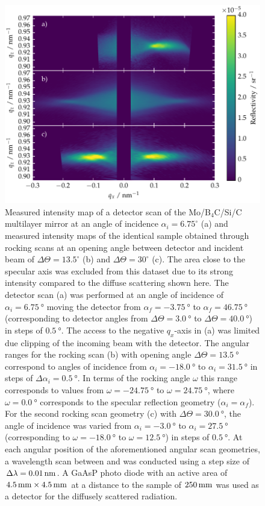 \begin{figure}[htbp]
        \includegraphics[width=\textwidth]{img/PTB17_diffuse_scattering_multiple_geometries} \caption{Measured intensity map of a detector scan of the Mo/B$_4$C/Si/C multilayer mirror at an angle of incidence $\alpha_i = 6.75^\circ$ (a) and measured intensity maps of the identical sample obtained through rocking scans at an opening angle between detector and incident beam of $\Delta \Theta = 13.5^\circ$ (b) and $\Delta \Theta = 30^\circ$ (c). The area close to the specular axis was excluded from this dataset due to its strong intensity compared to the diffuse scattering shown here. The detector scan (a) was performed at an angle of incidence of $\alpha_i = \SI{6.75}{\degree}$ moving the detector from $\alpha_f = \SI{-3.75}{\degree}$ to $\alpha_f = \SI{46.75}{\degree}$ (corresponding to detector angles from $\Delta \Theta = \SI{3.0}{\degree}$ to $\Delta \Theta = \SI{40.0}{\degree}$) in steps of $\SI{0.5}{\degree}$. The access to the negative $q_x$-axis in (a) was limited due clipping of the incoming beam with the detector. The angular ranges for the rocking scan (b) with opening angle $\Delta \Theta = \SI{13.5}{\degree}$ correspond to angles of incidence from $\alpha_i = \SI{-18.0}{\degree}$ to $\alpha_i = \SI{31.5}{\degree}$ in steps of $\Delta\alpha_i = \SI{0.5}{\degree}$. In terms of the rocking angle $\omega$ this range corresponds to values from $\omega = \SI{-24.75}{\degree}$ to $\omega = \SI{24.75}{\degree}$, where $\omega = \SI{0.0}{\degree}$ corresponds to the specular reflection geometry ($\alpha_i = \alpha_f$). For the second rocking scan geometry (c) with $\Delta \Theta = \SI{30.0}{\degree}$, the angle of incidence was varied from $\alpha_i = \SI{-3.0}{\degree}$ to $\alpha_i = \SI{27.5}{\degree}$ (corresponding to $\omega = \SI{-18.0}{\degree}$ to $\omega = \SI{12.5}{\degree}$) in steps of $\SI{0.5}{\degree}$. At each angular position of the aforementioned angular scan geometries, a wavelength scan between  and  was conducted using a step size of $\Delta \lambda = \nm{0.01}$.  A GaAsP photo diode with an active area of $\mm{4.5} \times \mm{4.5}$ at a distance to the sample of $\mm{250}$ was used as a detector for the diffusely scattered radiation.} \label{ch_diff:fig_PTB17_detector_and_rocking_maps}
\end{figure}
